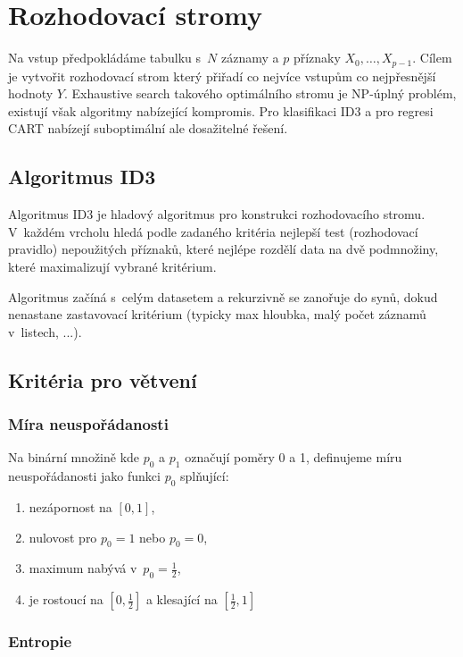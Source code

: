\section{Rozhodovací stromy}

Na vstup předpokládáme tabulku s~$N$ záznamy a $p$ příznaky $X_0, \ldots, X_{p-1}$. Cílem je vytvořit rozhodovací strom který přiřadí co nejvíce vstupům co nejpřesnější hodnoty $Y$. Exhaustive search takového optimálního stromu je NP-úplný problém, existují však algoritmy nabízející kompromis. Pro klasifikaci ID3 a pro regresi CART nabízejí suboptimální ale dosažitelné řešení.

\subsection{Algoritmus ID3}

Algoritmus ID3 je hladový algoritmus pro konstrukci rozhodovacího stromu. V~každém vrcholu hledá podle zadaného kritéria nejlepší test (rozhodovací pravidlo) nepoužitých příznaků, které nejlépe rozdělí data na dvě podmnožiny, které maximalizují vybrané kritérium.

Algoritmus začíná s~celým datasetem a rekurzivně se zanořuje do synů, dokud nenastane zastavovací kritérium (typicky max hloubka, malý počet záznamů v~listech, ...).

\subsection{Kritéria pro větvení}

\subsubsection{Míra neuspořádanosti}

Na binární množině kde $p_0$ a $p_1$ označují poměry 0 a 1, definujeme míru neuspořádanosti jako funkci $p_0$ splňující:
\begin{enumerate}
    \item nezápornost na $[0, 1]$,
    \item nulovost pro $p_0 = 1$ nebo $p_0 = 0$,
    \item maximum nabývá v~$p_0 = \frac{1}{2}$,
    \item je rostoucí na $\left[0, \frac{1}{2}\right]$ a klesající na $\left[\frac{1}{2}, 1\right]$
\end{enumerate}

\subsubsection{Entropie}

